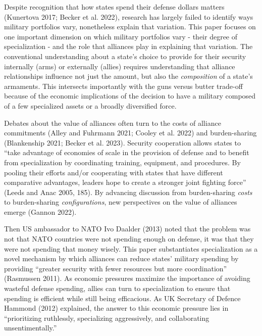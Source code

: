 \documentclass[
  12,
  letterpaper,
  DIV=11,
  numbers=noendperiod]{scrartcl}
\begin{document}
Despite recognition that how states spend their defense dollars matters
(Kunertova 2017; Becker et al. 2022), research has largely failed to
identify ways military portfolios vary, nonetheless explain that
variation. This paper focuses on one important dimension on which
military portfolios vary - their degree of specialization - and the role
that alliances play in explaining that variation. The conventional
understanding about a state's choice to provide for their security
internally (arms) or externally (allies) requires understanding that
alliance relationships influence not just the amount, but also the
\emph{composition} of a state's armaments. This intersects importantly
with the guns versus butter trade-off because of the economic
implications of the decision to have a military composed of a few
specialized assets or a broadly diversified force.

Debates about the value of alliances often turn to the costs of alliance
commitments (Alley and Fuhrmann 2021; Cooley et al. 2022) and
burden-sharing (Blankenship 2021; Becker et al. 2023). Security
cooperation allows states to ``take advantage of economies of scale in
the provision of defense and to benefit from specialization by
coordinating training, equipment, and procedures. By pooling their
efforts and/or cooperating with states that have different comparative
advantages, leaders hope to create a stronger joint fighting force''
(Leeds and Anac 2005, 185). By advancing discussion from burden-sharing
\emph{costs} to burden-sharing \emph{configurations}, new perspectives
on the value of alliances emerge (Gannon 2022).

Then US ambassador to NATO Ivo Daalder (2013) noted that the problem was
not that NATO countries were not spending enough on defense, it was that
they were not spending that money wisely. This paper substantiates
specialization as a novel mechanism by which alliances can reduce
states' military spending by providing ``greater security with fewer
resources but more coordination'' (Rasmussen 2011). As economic
pressures maximize the importance of avoiding wasteful defense spending,
allies can turn to specialization to ensure that spending is efficient
while still being efficacious. As UK Secretary of Defence Hammond (2012)
explained, the answer to this economic pressure lies in ``prioritizing
ruthlessly, specializing aggressively, and collaborating
unsentimentally.''
\end{document}

